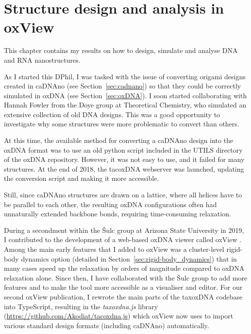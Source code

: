 \chapter{\label{ch:oxview}Structure design and analysis in oxView}

\minitoc

This chapter contains my results on how to design, simulate and analyse DNA and RNA nanostructures. 


As I started this DPhil, I was tasked with the issue of converting origami designs created in caDNAno (see Section~\ref{sec:cadnano}) so that they could be correctly simulated in oxDNA (see Section~\ref{sec:oxDNA}). I soon started collaborating with Hannah Fowler from the Doye group at Theoretical Chemistry, who simulated an extensive collection of old DNA designs. This was a good opportunity to investigate why some structures were more problematic to convert than others.

At this time, the available method for converting a caDNAno design into the oxDNA format was to use an old python script included in the UTILS directory of the oxDNA repository. However, it was not easy to use, and it failed for many structures. At the end of 2018, the tacoxDNA webserver \cite{suma2019tacoxdna} was launched, updating the conversion script and making it more accessible.

Still, since caDNAno structures are drawn on a lattice, where all helices have to be parallel to each other, the resulting oxDNA configurations often had unnaturally extended backbone bonds, requiring time-consuming relaxation.

During a secondment within the {\v{S}}ulc group at Arizona State University in 2019, I contributed to the development of a web-based oxDNA viewer called oxView \cite{poppleton2020design}. Among the main early features that I added to oxView was a cluster-level rigid-body dynamics option (detailed in Section~\ref{sec:rigid-body_dynamics}) that in many cases speed up the relaxation by orders of magnitude compared to oxDNA relaxation alone. Since then, I have collaborated with the {\v{S}}ulc group to add more features and to make the tool more accessible as a visualiser and editor. For our second oxView publication, I rewrote the main parts of the taxoxDNA codebase into TypeScript, resulting in the \emph{taxoxdna.js} library (\url{https://github.com/Akodiat/tacoxdna.js}) which oxView now uses to import various standard design formats (including caDNAno) automatically.

